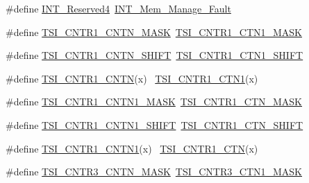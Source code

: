 \begin{DoxyCompactItemize}
\item 
\#define \hyperlink{group___backward___compatibility___symbols_ga57e54e2a9fff87486f5cf8d1636c2a02}{I\+N\+T\+\_\+\+Reserved4}~\hyperlink{group___interrupt__vector__numbers_gga5f3656e2a154b64aa378a2f3856c3a8da31162f6d7e4a5315ebf60004e4f32ac5}{I\+N\+T\+\_\+\+Mem\+\_\+\+Manage\+\_\+\+Fault}
\item 
\#define \hyperlink{group___backward___compatibility___symbols_gaf209d096db6b0858fc4872dc83ebae3e}{T\+S\+I\+\_\+\+C\+N\+T\+R1\+\_\+\+C\+N\+T\+N\+\_\+\+M\+A\+SK}~\hyperlink{group___t_s_i___register___masks_ga7d2647f0e7166cd22930dc7d15726bdc}{T\+S\+I\+\_\+\+C\+N\+T\+R1\+\_\+\+C\+T\+N1\+\_\+\+M\+A\+SK}
\item 
\#define \hyperlink{group___backward___compatibility___symbols_ga0e19e2d321b62d5538d9afac4da60e12}{T\+S\+I\+\_\+\+C\+N\+T\+R1\+\_\+\+C\+N\+T\+N\+\_\+\+S\+H\+I\+FT}~\hyperlink{group___t_s_i___register___masks_ga51545c15d46b9d961b3cd8a2aed33e46}{T\+S\+I\+\_\+\+C\+N\+T\+R1\+\_\+\+C\+T\+N1\+\_\+\+S\+H\+I\+FT}
\item 
\#define \hyperlink{group___backward___compatibility___symbols_ga0caa73e41bd823b4791e87b3fd06f4d0}{T\+S\+I\+\_\+\+C\+N\+T\+R1\+\_\+\+C\+N\+TN}(x)                                            ~\hyperlink{group___t_s_i___register___masks_ga2a691594a820a057852e27a1576af469}{T\+S\+I\+\_\+\+C\+N\+T\+R1\+\_\+\+C\+T\+N1}(x)
\item 
\#define \hyperlink{group___backward___compatibility___symbols_ga78f08903613eb2cae1ec1610ecd7a753}{T\+S\+I\+\_\+\+C\+N\+T\+R1\+\_\+\+C\+N\+T\+N1\+\_\+\+M\+A\+SK}~\hyperlink{group___t_s_i___register___masks_ga5c1efa805b567ae0b51c7b93c396afd5}{T\+S\+I\+\_\+\+C\+N\+T\+R1\+\_\+\+C\+T\+N\+\_\+\+M\+A\+SK}
\item 
\#define \hyperlink{group___backward___compatibility___symbols_ga0eae47baaf32aefc0f8736253c422080}{T\+S\+I\+\_\+\+C\+N\+T\+R1\+\_\+\+C\+N\+T\+N1\+\_\+\+S\+H\+I\+FT}~\hyperlink{group___t_s_i___register___masks_gafaa522509f837ff019a51e3c70e44261}{T\+S\+I\+\_\+\+C\+N\+T\+R1\+\_\+\+C\+T\+N\+\_\+\+S\+H\+I\+FT}
\item 
\#define \hyperlink{group___backward___compatibility___symbols_gaee284c1d73f65ae209ccbbb22933ffa1}{T\+S\+I\+\_\+\+C\+N\+T\+R1\+\_\+\+C\+N\+T\+N1}(x)                                          ~\hyperlink{group___t_s_i___register___masks_ga7136c31bbd395dd222bff4c650e768dc}{T\+S\+I\+\_\+\+C\+N\+T\+R1\+\_\+\+C\+TN}(x)
\item 
\#define \hyperlink{group___backward___compatibility___symbols_gad888e951c70c9db0096d0082548a94a3}{T\+S\+I\+\_\+\+C\+N\+T\+R3\+\_\+\+C\+N\+T\+N\+\_\+\+M\+A\+SK}~\hyperlink{group___t_s_i___register___masks_ga944c52b8a9c3019342c1c27eb7ab5d1f}{T\+S\+I\+\_\+\+C\+N\+T\+R3\+\_\+\+C\+T\+N1\+\_\+\+M\+A\+SK}

\end{DoxyCompactItemize}
